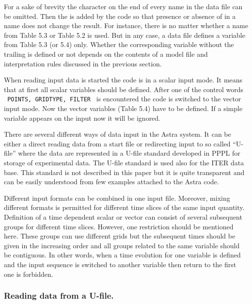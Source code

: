 For a sake of brevity the character  on the end of 
every name in the data file can be omitted. 
Then the  is added by the code so that presence or absence
of in a name does not change the result. 
For instance, there is no matter whether a name from Table 5.3 or 
Table 5.2 is used. 
But in any case, a data file defines a variable from Table 5.3 (or 5.4)
only. 
Whether the corresponding variable without the trailing  is
defined or not depends on the contents of a model file and
interpretation rules discussed in the previous section.

When reading input data is started the code is in a scalar input mode. 
It means that at first all scalar variables should be defined. 
After one of the control words
{\tt~POINTS, GRIDTYPE, FILTER~} is encountered the code is switched
to the vector input mode.
Now the vector variables (Table 5.4) have to be defined.
If a simple variable appears on the input now it will be ignored.

There are several different ways of data input in the Astra system. 
It can be either a direct reading data from a start file or redirecting
input to so called ``U-file'' where the data are represented in a U-file
standard developed in PPPL for storage of experimental data. 
The U-file standard is used also for the ITER data base. 
This standard is not described in this paper but it is quite
transparent and can be easily understood from few examples attached
to the Astra code.

Different input formats can be combined in one input file.
Moreover, mixing different formats is permitted for different time
slices of the same input quantity.
Definition of a time dependent scalar or vector can consist of several
subsequent groups for different time slices. 
However, one restriction should be mentioned here. 
These groups can use different grids but the
subsequent times should be given in the increasing order and
all groups related to the same variable should be contiguous.
In other words, when a time evolution for one variable is defined 
and the input sequence is switched to another variable 
then return to the first one is forbidden.

\subsubsection{Reading data from a U-file.}


